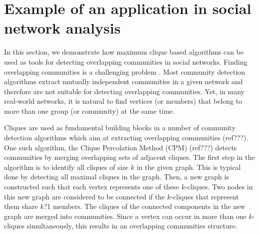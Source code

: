 \section{Example of an application in social network analysis}
\label{sec:applications}

In this section, we demonstrate how maximum clique based algorithms can be used as  tools for  
detecting overlapping communities in social networks. 
Finding overlapping communities is a challenging problem \cite{Fortunato_2010}. 
Most community detection algorithms extract mutually independent communities 
in a given network and therefore are not suitable for detecting overlapping communities.
Yet, in many real-world networks, it is natural to find vertices (or members) that belong to more than 
one group (or community) at the same time.

Cliques are used as fundamental building blocks in a number of community detection algorithms which aim at extracting overlapping communities (ref???). One such algorithm, the Clique Percolation Method (CPM) (ref???) detects communities by merging overlapping sets of adjacent cliques. The first step in the algorithm is to identify all cliques of size $k$ in the given graph. This is typical done by detecting all maximal cliques in the graph. Then, a new graph is constructed such that each vertex represents one of these $k$-cliques. Two nodes in this new graph are considered to be connected if the $k$-cliques that represent them share $k$?1 members. The cliques of the connected components in the new graph are merged into communities. Since a vertex can occur in more than one $k$-cliques simultaneously, this results in an overlapping communities structure.

